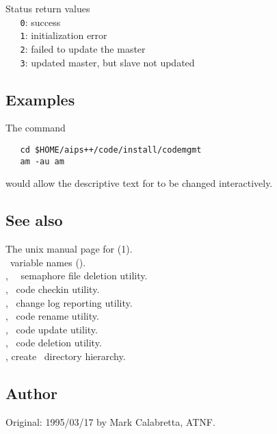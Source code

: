 Status return values
\\ \verb+   0+: success
\\ \verb+   1+: initialization error
\\ \verb+   2+: failed to update the master
\\ \verb+   3+: updated master, but slave not updated

\subsection*{Examples}

The command

\begin{verbatim}
   cd $HOME/aips++/code/install/codemgmt
   am -au am
\end{verbatim}

\noindent
would allow the descriptive text for  to be changed interactively.

\subsection*{See also}

The unix manual page for (1).\\
\aipspp\ variable names ().\\
, \aipspp\ \rcs\ semaphore file deletion utility.\\
, \aipspp\ code checkin utility.\\
, \aipspp\ change log reporting utility.\\
, \aipspp\ code rename utility.\\
, \aipspp\ code update utility.\\
, \aipspp\ code deletion utility.\\
, create \aipspp\ directory hierarchy.

\subsection*{Author}

Original: 1995/03/17 by Mark Calabretta, ATNF.


\newpage
\section{}
\label{amv}

